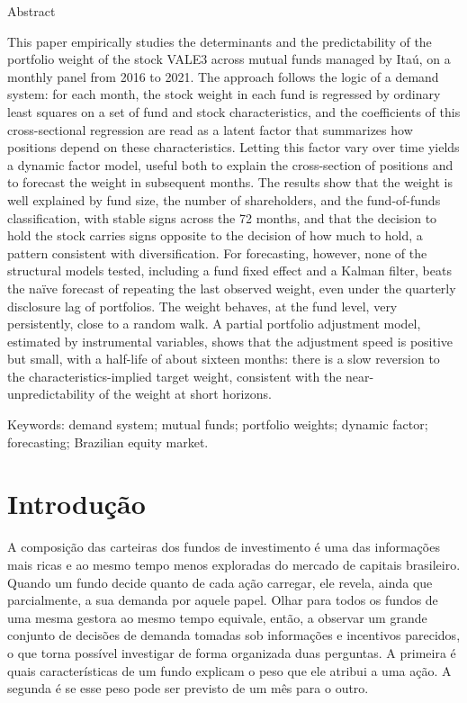 \documentclass[12pt,a4paper]{article}
\begin{document}
\bigskip
\begin{center}{\large Abstract}\end{center}
\noindent
This paper empirically studies the determinants and the predictability of the portfolio
weight of the stock VALE3 across mutual funds managed by Itaú, on a monthly panel from 2016
to 2021. The approach follows the logic of a demand system: for each month, the stock weight
in each fund is regressed by ordinary least squares on a set of fund and stock
characteristics, and the coefficients of this cross-sectional regression are read as a latent
factor that summarizes how positions depend on these characteristics. Letting this factor
vary over time yields a dynamic factor model, useful both to explain the cross-section of
positions and to forecast the weight in subsequent months. The results show that the weight
is well explained by fund size, the number of shareholders, and the fund-of-funds
classification, with stable signs across the 72 months, and that the decision to hold the
stock carries signs opposite to the decision of how much to hold, a pattern consistent with
diversification. For forecasting, however, none of the structural models tested, including a
fund fixed effect and a Kalman filter, beats the naïve forecast of repeating the last
observed weight, even under the quarterly disclosure lag of portfolios. The weight behaves,
at the fund level, very persistently, close to a random walk. A partial portfolio adjustment
model, estimated by instrumental variables, shows that the adjustment speed is positive but
small, with a half-life of about sixteen months: there is a slow reversion to the
characteristics-implied target weight, consistent with the near-unpredictability of the weight
at short horizons.

\smallskip
\noindent Keywords: demand system; mutual funds; portfolio weights; dynamic factor;
forecasting; Brazilian equity market.

\newpage
\thispagestyle{fancy}
\tableofcontents
\newpage

\section{Introdução}

A composição das carteiras dos fundos de investimento é uma das informações mais ricas e
ao mesmo tempo menos exploradas do mercado de capitais brasileiro. Quando um fundo decide
quanto de cada ação carregar, ele revela, ainda que parcialmente, a sua demanda por aquele
papel. Olhar para todos os fundos de uma mesma gestora ao mesmo tempo equivale, então, a
observar um grande conjunto de decisões de demanda tomadas sob informações e incentivos
parecidos, o que torna possível investigar de forma organizada duas perguntas. A primeira
é quais características de um fundo explicam o peso que ele atribui a uma ação. A segunda é
se esse peso pode ser previsto de um mês para o outro.
\end{document}

